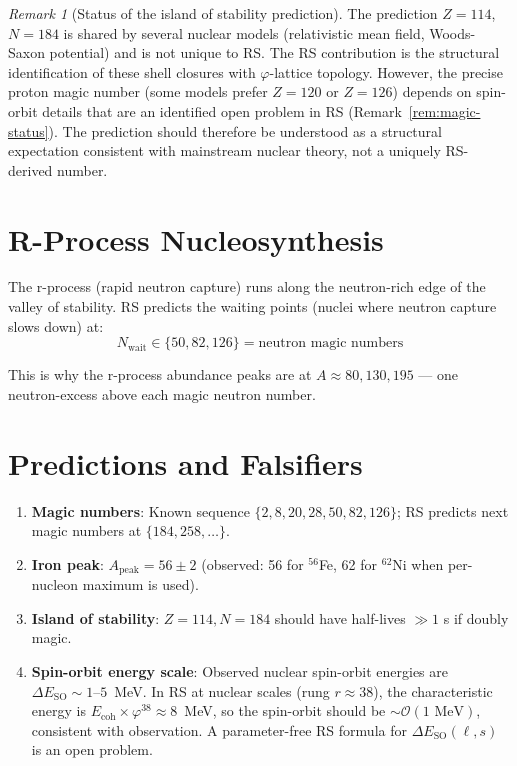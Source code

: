 \documentclass[12pt,a4paper]{article}
\theoremstyle{definition}
\theoremstyle{remark}
\newtheorem{remark}[theorem]{Remark}
\begin{document}
\begin{remark}[Status of the island of stability prediction]
The prediction $Z = 114$, $N = 184$ is shared by several nuclear
models (relativistic mean field, Woods-Saxon potential) and is not
unique to RS.  The RS contribution is the structural identification
of these shell closures with $\varphi$-lattice topology.  However,
the precise proton magic number (some models prefer $Z = 120$ or
$Z = 126$) depends on spin-orbit details that are an identified open
problem in RS (Remark~\ref{rem:magic-status}).  The prediction should
therefore be understood as a structural expectation consistent with
mainstream nuclear theory, not a uniquely RS-derived number.
\end{remark}

\section{R-Process Nucleosynthesis}

The r-process (rapid neutron capture) runs along the neutron-rich edge of the 
valley of stability. RS predicts the waiting points (nuclei where neutron capture 
slows down) at:
\begin{equation}
N_\mathrm{wait} \in \{50, 82, 126\} = \text{neutron magic numbers}
\end{equation}

This is why the r-process abundance peaks are at $A \approx 80, 130, 195$ — 
one neutron-excess above each magic neutron number.

\section{Predictions and Falsifiers}

\begin{enumerate}
\item \textbf{Magic numbers}: Known sequence $\{2, 8, 20, 28, 50, 82, 126\}$;
RS predicts next magic numbers at $\{184, 258, \ldots\}$.

\item \textbf{Iron peak}: $A_\mathrm{peak} = 56 \pm 2$ (observed: 56 for $^{56}$Fe, 
62 for $^{62}$Ni when per-nucleon maximum is used).

\item \textbf{Island of stability}: $Z = 114, N = 184$ should have half-lives $\gg 1$ s 
if doubly magic.

\item \textbf{Spin-orbit energy scale}: Observed nuclear spin-orbit energies are
$\Delta E_{\mathrm{SO}} \sim 1$--$5$~MeV.  In RS at nuclear scales (rung $r \approx 38$),
the characteristic energy is $E_{\mathrm{coh}} \times \varphi^{38} \approx 8$~MeV,
so the spin-orbit should be $\sim \mathcal{O}(1\text{~MeV})$, consistent with observation.
A parameter-free RS formula for $\Delta E_{\mathrm{SO}}(\ell, s)$ is an open problem.
\end{enumerate}
\end{document}
